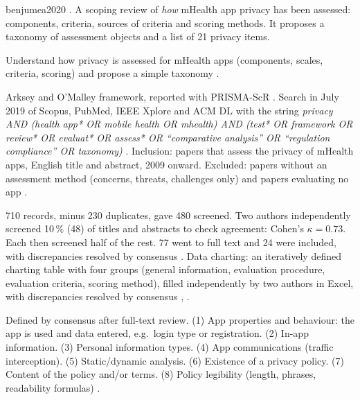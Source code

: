 \begin{papercard}{benjumea2020}
    . A scoping review of \emph{how} mHealth app privacy has been assessed: components, criteria, sources of criteria and scoring methods. It proposes a taxonomy of assessment objects and a list of 21 privacy items.

 Understand how privacy is assessed for mHealth apps (components, scales, criteria, scoring) and propose a simple taxonomy .

 Arksey and O'Malley framework, reported with PRISMA-ScR . Search in July 2019 of Scopus, PubMed, IEEE Xplore and ACM DL with the string \emph{privacy AND (health app* OR mobile health OR mhealth) AND (test* OR framework OR review* OR evaluat* OR assess* OR ``comparative analysis'' OR ``regulation compliance'' OR taxonomy)} . Inclusion: papers that assess the privacy of mHealth apps, English title and abstract, 2009 onward. Excluded: papers without an assessment method (concerns, threats, challenges only) and papers evaluating no app .

 710 records, minus 230 duplicates, gave 480 screened. Two authors independently screened 10\,\% (48) of titles and abstracts to check agreement: Cohen's $\kappa=0.73$. Each then screened half of the rest. 77 went to full text and 24 were included, with discrepancies resolved by consensus . Data charting: an iteratively defined charting table with four groups (general information, evaluation procedure, evaluation criteria, scoring method), filled independently by two authors in Excel, with discrepancies resolved by consensus , .

 Defined by consensus after full-text review. (1) App properties and behaviour: the app is used and data entered, e.g.\ login type or registration. (2) In-app information. (3) Personal information types. (4) App communications (traffic interception). (5) Static/dynamic analysis. (6) Existence of a privacy policy. (7) Content of the policy and/or terms. (8) Policy legibility (length, phrases, readability formulas) .


\end{papercard}

